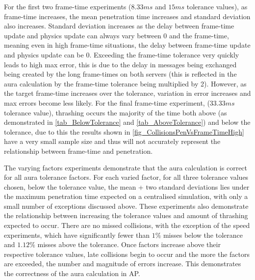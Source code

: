 For the first two frame-time experiments ($8.33ms$ and $15ms$ tolerance values), as frame-time increases, the mean penetration time increases and standard deviation also increases. Standard deviation increases as the delay between frame-time update and physics update can always vary between 0 and the frame-time, meaning even in high frame-time situations, the delay between frame-time update and physics update can be 0. Exceeding the frame-time tolerance very quickly leads to high max error, this is due to the delay in messages being exchanged being created by the long frame-times on both servers (this is reflected in the aura calculation by the frame-time tolerance being multiplied by 2). However, as the target frame-time increases over the tolerance, variation in error increases and max errors become less likely. For the final frame-time experiment, ($33.33ms$ tolerance value), thrashing occurs the majority of the time both above (as demonstrated in \ref{tab_BelowTolerance} and \ref{tab_AboveTolerance}) and below the tolerance, due to this the results shown in \ref{fig_CollisionsPenVsFrameTimeHigh} have a very small sample size and thus will not accurately represent the relationship between frame-time and penetration.

The varying factors experiments demonstrate that the aura calculation is correct for all aura tolerance factors. For each varied factor, for all three tolerance values chosen, below the tolerance value, the mean + two standard deviations lies under the maximum penetration time expected on a centralised simulation, with only a small number of exceptions discussed above. These experiments also demonstrate the relationship between increasing the tolerance values and amount of thrashing expected to occur. There are no missed collisions, with the exception of the speed experiments, which have significantly fewer than $1\%$ misses below the tolerance and $1.12\%$ misses above the tolerance. Once factors increase above their respective tolerance values, late collisions begin to occur and the more the factors are exceeded, the number and magnitude of errors increase. This demonstrates the correctness of the aura calculation in AP.


